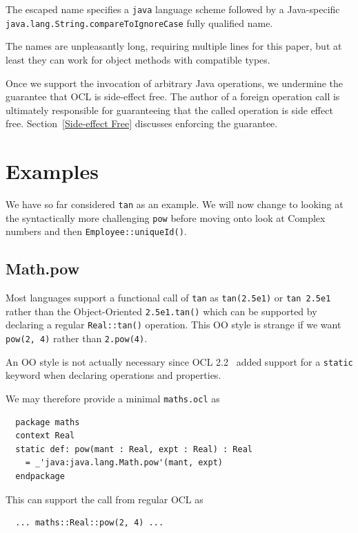 \documentclass[sigconf]{acmart}
\begin{document}
The escaped name specifies a \verb|java| language scheme followed by a Java-specific \verb|java.lang.String.compareToIgnoreCase| fully qualified name.

The names are unpleasantly long, requiring multiple lines for this paper, but at least they can work for object methods with compatible types.

Once we support the invocation of arbitrary Java operations, we undermine the guarantee that OCL is side-effect free. The author of a foreign operation call is ultimately responsible for guaranteeing that the called operation is side effect free. Section~\ref{Side-effect Free} discusses enforcing the guarantee.

\section{Examples}\label{Examples}

We have so far considered \verb|tan| as an example. We will now change to looking at the syntactically more challenging \verb|pow| before moving onto look at Complex numbers and then \verb|Employee::uniqueId()|. 

\subsection{Math.pow}

Most languages support a functional call of \verb|tan| as \verb|tan(2.5e1)| or \verb|tan 2.5e1| rather than the Object-Oriented \verb|2.5e1.tan()| which can be supported by declaring a regular \verb|Real::tan()| operation. This OO style is strange if we want \verb|pow(2, 4)| rather than \verb|2.pow(4)|.

An OO style is not actually necessary since OCL 2.2~\cite{OCL-2.2} added support for a \verb|static| keyword when declaring operations and properties.

We may therefore provide a minimal \verb|maths.ocl| as

\begin{verbatim}
  package maths
  context Real
  static def: pow(mant : Real, expt : Real) : Real
    = _'java:java.lang.Math.pow'(mant, expt)
  endpackage
\end{verbatim} 

This can support the call from regular OCL as

\begin{verbatim}
  ... maths::Real::pow(2, 4) ...
\end{verbatim} 
\end{document}
